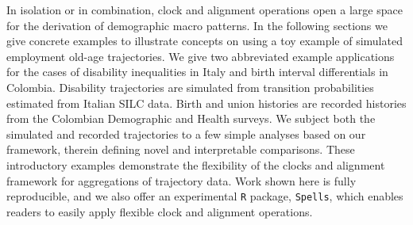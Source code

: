 \documentclass{article}
\begin{document}
In isolation or in combination, clock and alignment operations open a large space for the derivation of demographic macro patterns. In the following sections we give concrete examples to illustrate concepts on using a toy example of simulated employment old-age trajectories. We give two abbreviated example applications for the cases of disability inequalities in Italy and birth interval differentials in Colombia. Disability trajectories are simulated from transition probabilities estimated from Italian SILC data. Birth and union histories are recorded histories from the Colombian Demographic and Health surveys. We subject both the simulated and recorded trajectories to a few simple analyses based on our framework, therein defining novel and interpretable comparisons. These introductory examples demonstrate the flexibility of the clocks and alignment framework for aggregations of trajectory data. Work shown here is fully reproducible, and we also offer an experimental \texttt{R} package, \texttt{Spells}, which enables readers to easily apply flexible clock and alignment operations.
% 
\end{document}
